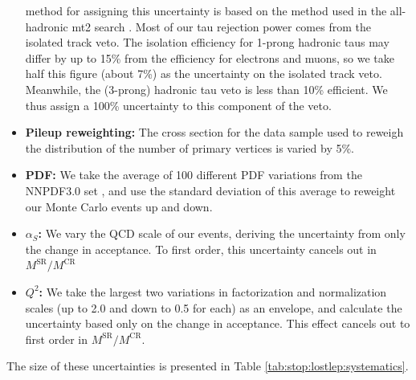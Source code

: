 \begin{itemize}
  method for assigning this uncertainty is based on the method used in
  the all-hadronic mt2 search \cite{mt2hadronic}. Most of our tau
  rejection power comes from the isolated track veto. The isolation
  efficiency for 1-prong hadronic taus may differ by up to 15\% from
  the efficiency for electrons and muons, so we take half this figure
  (about 7\%) as the uncertainty on the isolated track
  veto. Meanwhile, the (3-prong) hadronic tau veto is less
  than 10\% efficient. We thus assign a 100\% uncertainty to this
  component of the veto.
\item \textbf{Pileup reweighting:} The cross section for the data
  sample used to reweigh the distribution of the number of primary
  vertices is varied by 5\%.
\item \textbf{PDF:} We take the average of 100 different PDF
  variations from the NNPDF3.0 set \cite{nnpdf30}, and use the
  standard deviation of this average to reweight our Monte Carlo events
  up and down.
\item \textbf{$\alpha_S$:} We vary the QCD scale of our events,
  deriving the uncertainty from only the change in acceptance. To
  first order, this uncertainty cancels out in $M^\text{SR} / M^\text{CR}$
\item \textbf{$Q^2$:} We take the largest two variations in
  factorization and normalization scales (up to 2.0 and
  down to 0.5 for each) as an envelope, and calculate
  the uncertainty based only on the change in acceptance. This effect
  cancels out to first order in $M^\text{SR} / M^\text{CR}$.
\end{itemize}
The size of these uncertainties is presented in Table
\ref{tab:stop:lostlep:systematics}.

